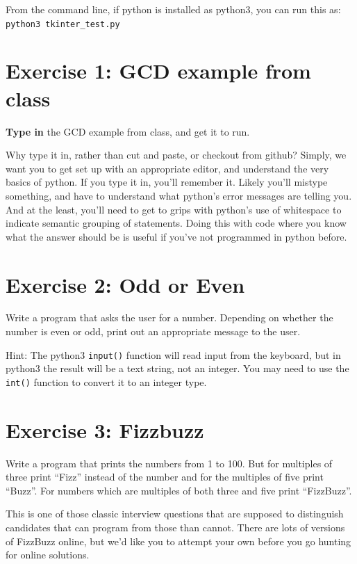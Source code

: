 \documentclass{article}
\begin{document}
\vspace{0.1in}\noindent From the command line, if python is installed as python3, you can run this as:\\
\texttt{python3 tkinter\_test.py}

\section*{Exercise 1: GCD example from class}

\textbf{Type in} the GCD example from class, and get it to run.

\vspace{0.1in} Why type it in, rather than cut and paste, or checkout
from github?  Simply, we want you to get set up with an appropriate
editor, and understand the very basics of python. If you type it in,
you'll remember it.  Likely you'll mistype something, and have to
understand what python's error messages are telling you.  And at the
least, you'll need to get to grips with python's use of whitespace to
indicate semantic grouping of statements.  Doing this with code where
you know what the answer should be is useful if you've not programmed
in python before.

\section*{Exercise 2: Odd or Even}

Write a program that asks the user for a number. Depending on whether
the number is even or odd, print out an appropriate message to the
user.

\vspace{0.1in}\noindent Hint: The python3 \texttt{input()} function will read input from the keyboard,
but in python3 the result will be a text string, not an integer.  You
may need to use the \texttt{int()} function to convert it to an integer type.

\section*{Exercise 3: Fizzbuzz}

Write a program that prints the numbers from 1 to 100. But for
multiples of three print ``Fizz'' instead of the number and for the
multiples of five print ``Buzz''. For numbers which are multiples of
both three and five print ``FizzBuzz''.

This is one of those classic interview questions that are supposed to
distinguish candidates that can program from those than cannot.  There
are lots of versions of FizzBuzz online, but we'd like you to attempt
your own before you go hunting for online solutions.
\end{document}
